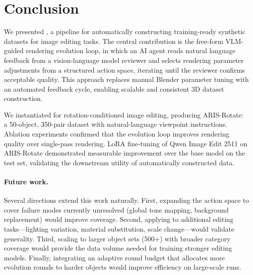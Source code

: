 \section{Conclusion}
\label{sec:conclusion}

We presented \aris{}, a pipeline for automatically constructing training-ready
synthetic datasets for image editing tasks.
The central contribution is the free-form VLM-guided rendering evolution loop,
in which an AI agent reads natural language feedback from a vision-language model reviewer
and selects rendering parameter adjustments from a structured action space,
iterating until the reviewer confirms acceptable quality.
This approach replaces manual Blender parameter tuning with an automated feedback cycle,
enabling scalable and consistent 3D dataset construction.

We instantiated \aris{} for rotation-conditioned image editing,
producing ARIS-Rotate: a 50-object, 350-pair dataset
with natural-language viewpoint instructions.
Ablation experiments confirmed that the evolution loop improves rendering quality
over single-pass rendering.
LoRA fine-tuning of Qwen Image Edit 2511 on ARIS-Rotate
demonstrated measurable improvement over the base model on the test set,
validating the downstream utility of automatically constructed data.

\paragraph{Future work.}
Several directions extend this work naturally.
First, expanding the action space to cover failure modes currently unresolved
(global tone mapping, background replacement) would improve coverage.
Second, applying \aris{} to additional editing tasks---lighting variation,
material substitution, scale change---would validate generality.
Third, scaling to larger object sets (500+) with broader category coverage
would provide the data volume needed for training stronger editing models.
Finally, integrating an adaptive round budget that allocates more evolution rounds
to harder objects would improve efficiency on large-scale runs.
